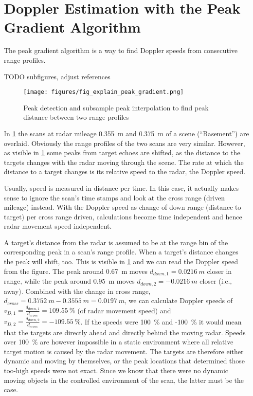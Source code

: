 \section{Doppler Estimation with the Peak Gradient Algorithm}\label{doppler-estimation-with-the-peak-gradient-algorithm}

The peak gradient algorithm is a way to find Doppler speeds from
consecutive range profiles.

TODO subfigures, adjust references
\the\textwidth

\begin{figure}[htbp]
    \centering
    \texttt{[image: figures/fig\_explain\_peak\_gradient.png]}
    \caption{Peak detection and subsample peak interpolation to find peak distance between two range profiles}
    \label{fig:fig_explain_peak_gradient}
\end{figure}

In \cref{fig:fig_explain_peak_gradient} the scans at radar mileage \SI{0.355}{m} and \SI{0.375}{m} of a scene (``Basement'') are overlaid. Obviously the range profiles of the
two scans are very similar. However, as visible in \cref{fig:fig_explain_peak_gradient} some
peaks from target echoes are shifted, as the distance to the targets
changes with the radar moving through the scene. The rate at which the
distance to a target changes is its relative speed to the radar, the
Doppler speed.

Usually, speed is measured in distance per time. In this case, it
actually makes sense to ignore the scan's time stamps and look at the
cross range (driven mileage) instead. With the Doppler speed as change
of down range (distance to target) per cross range driven, calculations
become time independent and hence radar movement speed independent.

A target's distance from the radar is assumed to be at the range bin of
the corresponding peak in a scan's range profile. When a target's
distance changes the peak will shift, too. This is visible in \cref{fig:fig_explain_peak_gradient} and we can read the Doppler speed from the figure. The peak around \SI{0.67}{m} moves \(d_{down,1} = \SI{0.0216}{m}\) closer in range, while the peak
around \SI{0.95}{m} moves \(d_{down,2} = -\SI{0.0216}{m}\) closer (i.e., away).
Combined with the change in cross range,
\(d_{cross} = \SI{0.3752}{m} - \SI{0.3555}{m} = \SI{0.0197}{m}\), we can calculate Doppler
speeds of \(v_{D,1} = \frac{d_{down,1}}{d_{cross}} = \SI{109.55}{\%}\) (of
radar movement speed) and
\(v_{D,2} = \frac{d_{down,2}}{d_{cross}} = -\SI{109.55}{\%}\). If the speeds
were \SI{100}{\%} and -\SI{100}{\%} it would mean that the targets are directly
ahead and directly behind the moving radar. Speeds over \SI{100}{\%} are
however impossible in a static environment where all relative target
motion is caused by the radar movement. The targets are therefore either
dynamic and moving by themselves, or the peak locations that determined
those too-high speeds were not exact. Since we know that there were no
dynamic moving objects in the controlled environment of the scan, the
latter must be the case.

